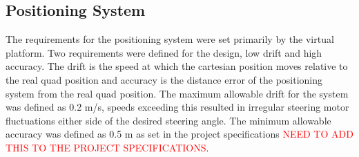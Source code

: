 \documentclass[main.tex]{subfiles}
\begin{document}
\subsection{Positioning System}
The requirements for the positioning system were set primarily by the virtual platform. Two requirements were defined for the design, low drift and high accuracy. The drift is the speed at which the cartesian position moves relative to the real quad position and accuracy is the distance error of the positioning system from the real quad position. The maximum allowable drift for the system was defined as 0.2 m/s, speeds exceeding this resulted in irregular steering motor fluctuations either side of the desired steering angle. The minimum allowable accuracy was defined as 0.5 m as set in the project specifications \textcolor{red}{NEED TO ADD THIS TO THE PROJECT SPECIFICATIONS}.
\end{document}
